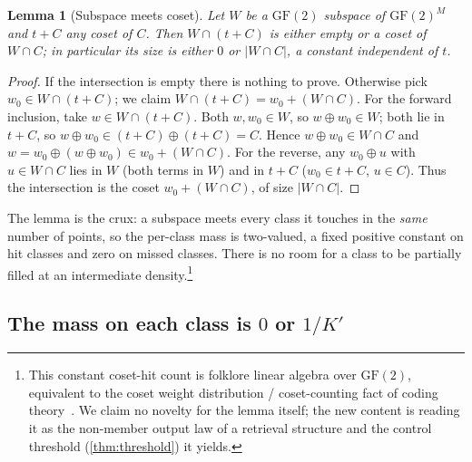 \documentclass[11pt]{article}
\theoremstyle{definition}
\theoremstyle{plain}
\newtheorem{lemma}[theorem]{Lemma}
\theoremstyle{remark}
\newcommand{\GF}{\mathrm{GF}(2)}
\newcommand{\W}{W}                          %
\newcommand{\inter}{\cap}
\begin{document}
\begin{lemma}[Subspace meets coset]
\label{lem:subspace-coset}
Let $\W$ be a $\GF$ subspace of $\GF^M$ and $t + C$ any coset of $C$. Then
$\W \inter (t + C)$ is either empty or a coset of $\W \inter C$; in particular its size
is either $0$ or $|\W \inter C|$, a constant independent of $t$.
\end{lemma}

\begin{proof}
If the intersection is empty there is nothing to prove. Otherwise pick
$w_0 \in \W \inter (t + C)$; we claim $\W \inter (t + C) = w_0 + (\W \inter C)$. For
the forward inclusion, take $w \in \W \inter (t + C)$. Both $w, w_0 \in \W$, so
$w \oplus w_0 \in \W$; both lie in $t + C$, so $w \oplus w_0 \in
(t+C) \oplus (t+C) = C$. Hence $w \oplus w_0 \in \W \inter C$ and
$w = w_0 \oplus (w \oplus w_0) \in w_0 + (\W \inter C)$. For the reverse, any
$w_0 \oplus u$ with $u \in \W \inter C$ lies in $\W$ (both terms in $\W$) and in
$t + C$ ($w_0 \in t+C$, $u \in C$). Thus the intersection is the coset
$w_0 + (\W \inter C)$, of size $|\W \inter C|$.
\end{proof}

The lemma is the crux: a subspace meets every class it touches in the \emph{same}
number of points, so the per-class mass is two-valued, a fixed positive constant on hit
classes and zero on missed classes. There is no room for a class to be partially filled
at an intermediate density.\footnote{This constant coset-hit count is folklore linear
algebra over $\GF$, equivalent to the coset weight distribution / coset-counting fact of
coding theory~\cite{macwilliams1977}. We claim no novelty for the lemma itself; the new
content is reading it as the non-member output law of a retrieval structure and the
control threshold (\cref{thm:threshold}) it yields.}

\subsection{\texorpdfstring{The mass on each class is $0$ or $1/K'$}{The mass on each class is 0 or 1/K'}}
\end{document}
